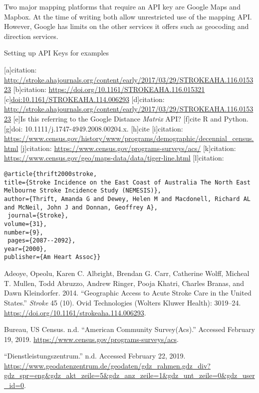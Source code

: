 \documentclass[]{article}
\begin{document}
Two major mapping platforms that require an API key are Google Maps and
Mapbox. At the time of writing both allow unrestricted use of the
mapping API. However, Google has limits on the other services it offers
such as geocoding and direction services.

Setting up API Keys for examples

{[}a{]}citation:
\url{http://stroke.ahajournals.org/content/early/2017/03/29/STROKEAHA.116.015323}
{[}b{]}citation: \url{https://doi.org/10.1161/STROKEAHA.116.015321}
{[}c{]}\url{doi:10.1161/STROKEAHA.114.006293} {[}d{]}citation:
\url{http://stroke.ahajournals.org/content/early/2017/03/29/STROKEAHA.116.015323}
{[}e{]}Is this referring to the Google Distance \emph{Matrix} API?
{[}f{]}cite R and Python. {[}g{]}doi: 10.1111/j.1747-4949.2008.00204.x.
{[}h{]}cite {[}i{]}citation:
\url{https://www.census.gov/history/www/programs/demographic/decennial_census.html}
{[}j{]}citation: \url{https://www.census.gov/programs-surveys/acs/}
{[}k{]}citation:
\url{https://www.census.gov/geo/maps-data/data/tiger-line.html}
{[}l{]}citation:

\begin{verbatim}
@article{thrift2000stroke,
title={Stroke Incidence on the East Coast of Australia The North East Melbourne Stroke Incidence Study (NEMESIS)},
author={Thrift, Amanda G and Dewey, Helen M and Macdonell, Richard AL and McNeil, John J and Donnan, Geoffrey A},
 journal={Stroke},
volume={31},
number={9},
 pages={2087--2092},
year={2000},
publisher={Am Heart Assoc}}
\end{verbatim}

\hypertarget{refs}{}
\leavevmode\hypertarget{ref-Adeoye_2014}{}%
Adeoye, Opeolu, Karen C. Albright, Brendan G. Carr, Catherine Wolff,
Micheal T. Mullen, Todd Abruzzo, Andrew Ringer, Pooja Khatri, Charles
Branas, and Dawn Kleindorfer. 2014. ``Geographic Access to Acute Stroke
Care in the United States.'' \emph{Stroke} 45 (10). Ovid Technologies
(Wolters Kluwer Health): 3019--24.
\url{https://doi.org/10.1161/strokeaha.114.006293}.

\leavevmode\hypertarget{ref-us_census_bureau_acs}{}%
Bureau, US Census. n.d. ``American Community Survey(Acs).'' Accessed
February 19, 2019. \url{https://www.census.gov/programs-surveys/acs}.

\leavevmode\hypertarget{ref-germany-gis}{}%
``Dienstleistungszentrum.'' n.d. Accessed February 22, 2019.
\url{https://www.geodatenzentrum.de/geodaten/gdz_rahmen.gdz_div?gdz_spr=eng\&gdz_akt_zeile=5\&gdz_anz_zeile=1\&gdz_unt_zeile=0\&gdz_user_id=0}.
\end{document}
